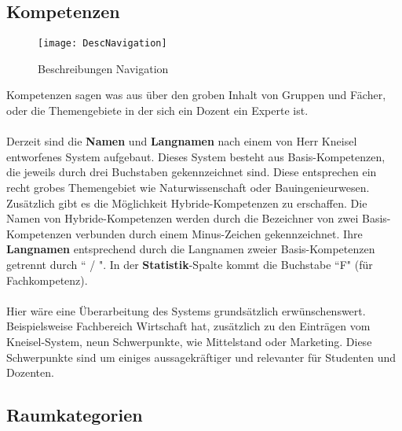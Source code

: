 \newpage
\subsection{Kompetenzen}
\label{subsec:kompetenzen}

\begin{wrapfigure}{r}{0.4\textwidth}
	\vspace{-15pt}
	\texttt{[image: DescNavigation]}
	\vspace{-25pt}
	\caption{Beschreibungen Navigation}
	\label{fig:description-navigation}
\end{wrapfigure}

Kompetenzen sagen was aus über den groben Inhalt von Gruppen und Fächer, oder die Themengebiete in der sich ein Dozent ein Experte ist.\\
\\
Derzeit sind die \textbf{Namen} und \textbf{Langnamen} nach einem von Herr Kneisel entworfenes System aufgebaut. Dieses System besteht aus Basis-Kompetenzen, die jeweils durch drei Buchstaben gekennzeichnet sind. Diese entsprechen ein recht grobes Themengebiet wie Naturwissenschaft oder Bauingenieurwesen. Zusätzlich gibt es die Möglichkeit Hybride-Kompetenzen zu erschaffen. Die Namen von Hybride-Kompetenzen werden durch die Bezeichner von zwei Basis-Kompetenzen verbunden durch einem Minus-Zeichen gekennzeichnet. Ihre \textbf{Langnamen} entsprechend durch die Langnamen zweier Basis-Kompetenzen getrennt durch `` / ". In der \textbf{Statistik}-Spalte kommt die Buchstabe ``F" (für Fachkompetenz).\\
\\
Hier wäre eine Überarbeitung des Systems grundsätzlich erwünschenswert. Beispielsweise Fachbereich Wirtschaft hat, zusätzlich zu den Einträgen vom Kneisel-System, neun Schwerpunkte, wie Mittelstand oder Marketing. Diese Schwerpunkte sind um einiges aussagekräftiger und relevanter für Studenten und Dozenten.

\subsection{Raumkategorien}
\label{subsec:roomcategory}

